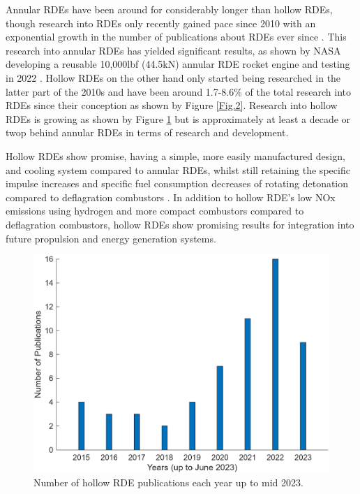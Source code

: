 \documentclass{article}
\begin{document}
Annular RDEs have been around for considerably longer than hollow RDEs, though research into RDEs only recently gained pace since 2010 with an exponential growth in the number of publications about RDEs ever since \cite{Wang2020}. This research into annular RDEs has yielded significant results, as shown by NASA developing a reusable 10,000lbf (44.5kN) annular RDE rocket engine and testing in 2022 \cite{Osorio2023}. Hollow RDEs on the other hand only started being researched in the latter part of the 2010s \cite{Stoddard2015} and have been around 1.7-8.6\% of the total research into RDEs since their conception as shown by Figure \ref{Fig.2}. Research into hollow RDEs is growing as shown by Figure \ref{Fig.3} but is approximately at least a decade or twop behind annular RDEs in terms of research and development. 
\par

Hollow RDEs show promise, having a simple, more easily manufactured design, and cooling system compared to annular RDEs, whilst still retaining the specific impulse increases and specific fuel consumption decreases of rotating detonation compared to deflagration combustors \cite{1Anand2019}. In addition to hollow RDE’s low NOx emissions using hydrogen \cite{Stoddard2017} and more compact combustors \cite{Ishihara2023} compared to deflagration combustors, hollow RDEs show promising results for integration into future propulsion and energy generation systems.
\par

\begin{figure}
\centering
\includegraphics[scale=0.75]{HRDEpubsovertime.png}
\caption{Number of hollow RDE publications each year up to mid 2023.}\label{Fig.3}
\end{figure}
\end{document}
